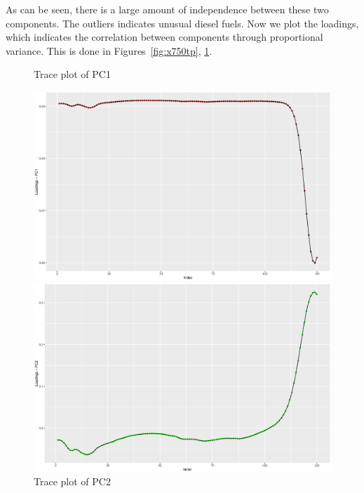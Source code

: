\documentclass[a4paper,12pt]{article}
\begin{document}
        As can be seen, there is a large amount of independence between these two components. The outliers indicates unusual diesel fuels. Now we plot the loadings, which indicates the correlation between components through proportional variance. This is done in Figures~\ref{fig:x750tp}, \ref{fig:x752tp}. 

        \begin{figure}[H]
            \centering
            \begin{minipage}[]{0.49\textwidth}
                \caption{Trace plot of PC1\label{fig:x750tp}}
                \includegraphics[width=\textwidth]{share/A2_trace_PC1.eps}
            \end{minipage}
            \begin{minipage}[]{0.49\textwidth}
                \caption{Trace plot of PC2 \label{fig:x752tp}}
                \includegraphics[width=\textwidth]{share/A2_trace_PC2.eps}
            \end{minipage}
        \end{figure}
\end{document}
